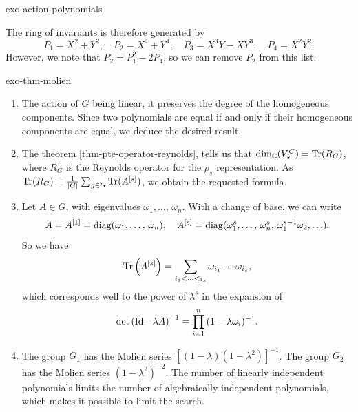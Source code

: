 \begin{correction}{exo-action-polynomials}
\begin{enumerate}
\begin{equation*}
\end{equation*}
The ring of invariants is therefore generated by
\begin{equation*}
P_1 = X^2 + Y^2, \quad P_2 = X^4 + Y^4, \quad P_3 = X^3 Y - XY^3, \quad P_4 = X^2 Y^2.
\end{equation*}
However, we note that $ P_2 = P_1^2 - 2 P_4 $, so we can remove $ P_2 $ from this list.
\end{enumerate}
\end{correction}
 
 
\begin{correction}{exo-thm-molien}
\begin{enumerate}
\item The action of $ G $ being linear, it preserves the degree of the homogeneous components. Since two polynomials are equal if and only if their homogeneous components are equal, we deduce the desired result.
\item {}  The theorem \ref{thm-pte-operator-reynolds}, tells us that $ \dim_{\mathbb{C}} (V_s^G) = \operatorname{Tr} (R_G) $, where $ R_G $ is the Reynolds operator for the $ \rho_s $ representation. As $ \operatorname{Tr} (R_G) = \frac{1}{|G|} \sum_{g \in G}{\operatorname{Tr} (A^{[s]})} $, we obtain the requested formula.
\item Let $ A \in G $, with eigenvalues $ \omega_1, \ldots, \, \omega_n $. With a change of base, we can write
\begin{equation*}
A = A^{[1]} = \operatorname{diag} (\omega_1, \ldots, \, \omega_n), \quad A^{[s]} = \operatorname{diag} (\omega_1^s, \ldots, \, \omega_n^s, \, \omega_1^{s-1} \omega_2, \ldots).
\end{equation*}
So we have
\begin{equation*}
\operatorname{Tr} \left(A^{[s]} \right) = \sum_{i_1 \leq \cdots \leq i_s}{\omega_{i_1} \cdots \omega_{i_s}},
\end{equation*}
which corresponds well to the power of $ \lambda^s $ in the expansion of
\begin{equation*}
\det \left(\operatorname{Id} - \lambda A \right)^{-1} = \prod_{i = 1}^n{(1- \lambda \omega_i)^{-1}}.
\end{equation*}
 
\item The group $ G_1 $ has the Molien series $ [(1- \lambda) (1- \lambda^2)]^{-1} $. The group $ G_2 $ has the Molien series $ (1- \lambda^2)^{- 2} $. The number of linearly independent polynomials limits the number of algebraically independent polynomials, which makes it possible to limit the search.
\end{enumerate}
\end{correction}
 
